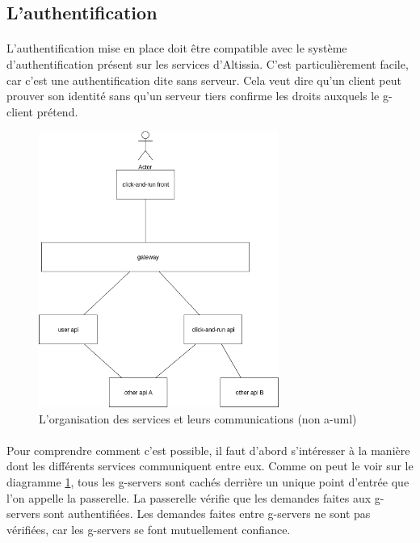 \subsection{L'authentification}
\label{subsec:auth-feature}

\paragraph{}
L'authentification mise en place doit être compatible avec le système d'authentification présent sur les services d'Altissia. C'est particulièrement facile, car c'est une authentification dite sans serveur. Cela veut dire qu'un client peut prouver son identité sans qu'un serveur tiers confirme les droits auxquels le \gls{g-client} prétend. 

\begin{figure}[h]
    \centering
    \includegraphics[width=0.7\textwidth]{images/diagrams/gw-archi.png}
    \caption{L'organisation des services et leurs communications (non \gls{a-uml})}
    \label{fig:gw-archi}
\end{figure}

\paragraph{}
Pour comprendre comment c'est possible, il faut d'abord s'intéresser à la manière dont les différents services communiquent entre eux. Comme on peut le voir sur le diagramme \ref{fig:gw-archi}, tous les \glspl{g-server} sont cachés derrière un unique point d'entrée que l'on appelle la passerelle. La passerelle vérifie que les demandes faites aux \glspl{g-server} sont authentifiées. Les demandes faites entre \glspl{g-server} ne sont pas vérifiées, car les \glspl{g-server} se font mutuellement confiance.

